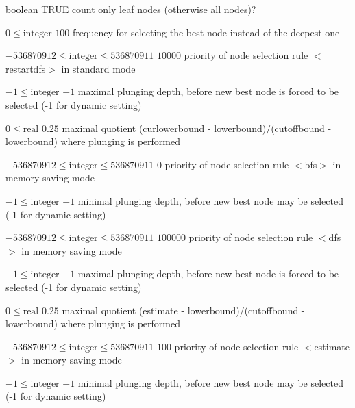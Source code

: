 %
{boolean}%
{TRUE}%
{count only leaf nodes (otherwise all nodes)?}%
{}

%
{$0\leq\textrm{integer}$}%
{$100$}%
{frequency for selecting the best node instead of the deepest one}%
{}

%
{$-536870912\leq\textrm{integer}\leq536870911$}%
{$10000$}%
{priority of node selection rule $<$restartdfs$>$ in standard mode}%
{}

%
{$-1\leq\textrm{integer}$}%
{$-1$}%
{maximal plunging depth, before new best node is forced to be selected (-1 for dynamic setting)}%
{}

%
{$0\leq\textrm{real}$}%
{$0.25$}%
{maximal quotient (curlowerbound - lowerbound)/(cutoffbound - lowerbound) where plunging is performed}%
{}

%
{$-536870912\leq\textrm{integer}\leq536870911$}%
{$0$}%
{priority of node selection rule $<$bfs$>$ in memory saving mode}%
{}

%
{$-1\leq\textrm{integer}$}%
{$-1$}%
{minimal plunging depth, before new best node may be selected (-1 for dynamic setting)}%
{}

%
{$-536870912\leq\textrm{integer}\leq536870911$}%
{$100000$}%
{priority of node selection rule $<$dfs$>$ in memory saving mode}%
{}

%
{$-1\leq\textrm{integer}$}%
{$-1$}%
{maximal plunging depth, before new best node is forced to be selected (-1 for dynamic setting)}%
{}

%
{$0\leq\textrm{real}$}%
{$0.25$}%
{maximal quotient (estimate - lowerbound)/(cutoffbound - lowerbound) where plunging is performed}%
{}

%
{$-536870912\leq\textrm{integer}\leq536870911$}%
{$100$}%
{priority of node selection rule $<$estimate$>$ in memory saving mode}%
{}

%
{$-1\leq\textrm{integer}$}%
{$-1$}%
{minimal plunging depth, before new best node may be selected (-1 for dynamic setting)}%
{}

